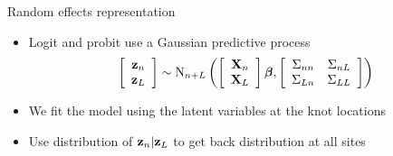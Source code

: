 \documentclass{beamer}
\begin{document}
\begin{frame}{Random effects representation}
  \begin{itemize} \setlength{\itemsep}{1em}
    \item Logit and probit use a Gaussian predictive process
    \begin{align*}
      \left[ \begin{array}{c}
        \mbox{\bf z}_n \\
        \mbox{\bf z}_L
      \end{array} \right]
      \sim \text{N}_{n + L} \left(
      \left[ \begin{array}{c}
        \mbox{\bf X}_n \\
        \mbox{\bf X}_L
      \end{array} \right] \mbox{\boldmath $\beta$},
      \left[ \begin{array}{cc}
        \Sigma_{nn} & \Sigma_{nL} \\
        \Sigma_{Ln} & \Sigma_{LL}
      \end{array} \right]
      \right)
    \end{align*}
    \item We fit the model using the latent variables at the knot locations
    \item Use distribution of $\mbox{\bf z}_n | \mbox{\bf z}_L$ to get back distribution at all sites
  \end{itemize}
\end{frame}
\end{document}
